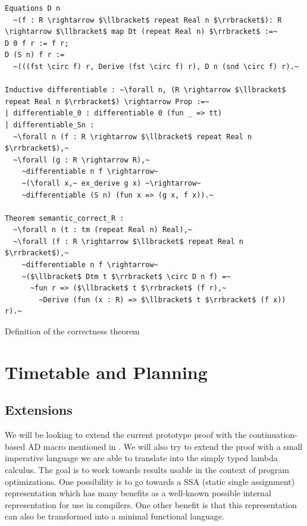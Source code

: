 \documentclass[12pt, final]{article}
\begin{document}
\begin{listing}
  \begin{verbatim}
Equations D n
  ~(f : R \rightarrow $\llbracket$ repeat Real n $\rrbracket$): R \rightarrow $\llbracket$ map Dt (repeat Real n) $\rrbracket$ :=~
D 0 f r := f r;
D (S n) f r :=
  ~(((fst \circ f) r, Derive (fst \circ f) r), D n (snd \circ f) r).~

Inductive differentiable : ~\forall n, (R \rightarrow $\llbracket$ repeat Real n $\rrbracket$) \rightarrow Prop :=~
| differentiable_0 : differentiable 0 (fun _ => tt)
| differentiable_Sn :
  ~\forall n (f : R \rightarrow $\llbracket$ repeat Real n $\rrbracket$),~
  ~\forall (g : R \rightarrow R),~
    ~differentiable n f \rightarrow~
    ~(\forall x,~ ex_derive g x) ~\rightarrow~
    ~differentiable (S n) (fun x => (g x, f x)).~

Theorem semantic_correct_R :
  ~\forall n (t : tm (repeat Real n) Real),~
  ~\forall (f : R \rightarrow $\llbracket$ repeat Real n $\rrbracket$),~
    ~differentiable n f \rightarrow~
    ~($\llbracket$ Dtm t $\rrbracket$ \circ D n f) =~
      ~fun r => ($\llbracket$ t $\rrbracket$ (f r),~
        ~Derive (fun (x : R) => $\llbracket$ t $\rrbracket$ (f x)) r).~
  \end{verbatim}
  \caption{Definition of the correctness theorem}
  \label{lst:direct_correctness}
\end{listing}

\section{Timetable and Planning}

\subsection{Extensions}

We will be looking to extend the current prototype proof with the continuation-based AD macro mentioned in \cite{huot2020correctness}.
We will also try to extend the proof with a small imperative language we are able to translate into the simply typed lambda calculus.
The goal is to work towards results usable in the context of program optimizations.
One possibility is to go towards a SSA (static single assignment) representation which has many benefits as a well-known possible internal representation for use in compilers\cite{Pop2006}.
One other benefit is that this representation can also be transformed into a minimal functional language\cite{chakravarty2004347}.
\end{document}
